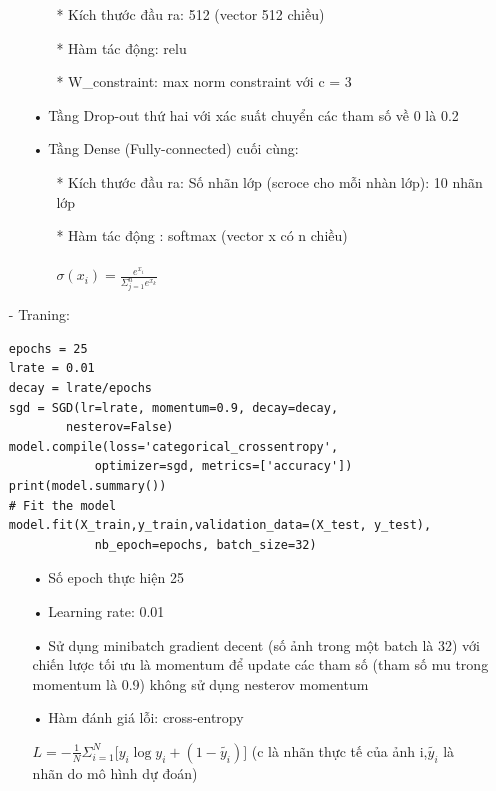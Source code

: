 \documentclass[a4paper,12pt]{report}
\begin{document}
\begin{itemize}
\begin{itemize}
\begin{itemize}
\item[*] Kích thước đầu ra: 512 (vector 512 chiều)
\item[*] Hàm tác động: relu
\item[*] W\_constraint:  max norm constraint với c = 3
\end{itemize}
\item[•] Tầng Drop-out thứ hai với xác suất chuyển các tham số về 0 là 0.2
\item[•] Tầng Dense (Fully-connected) cuối cùng:
\begin{itemize}
\item[*] Kích thước đầu ra: Số nhãn lớp (scroce cho mỗi nhàn lớp): 10 nhãn lớp
\item[*] Hàm tác động : softmax (vector x có n chiều) \\ \\ 
\hspace*{2cm} $\sigma(x_i) = \frac{e^{x_i}}{\Sigma_{j=1}^{n}e^{x_k}}$
\end{itemize}
\end{itemize}
\item[-] Traning:
\begin{lstlisting}
epochs = 25
lrate = 0.01
decay = lrate/epochs
sgd = SGD(lr=lrate, momentum=0.9, decay=decay, 
		nesterov=False)
model.compile(loss='categorical_crossentropy', 
			optimizer=sgd, metrics=['accuracy'])
print(model.summary())
# Fit the model
model.fit(X_train,y_train,validation_data=(X_test, y_test), 
			nb_epoch=epochs, batch_size=32)
\end{lstlisting}
\begin{itemize}
\item[•] Số epoch thực hiện 25
\item[•] Learning rate: 0.01
\item[•] Sử dụng minibatch gradient decent (số ảnh trong một batch là 32) với chiến lược tối ưu là momentum để update các tham số (tham số mu trong momentum là 0.9) không sử dụng nesterov momentum
\item[•] Hàm đánh giá lỗi: cross-entropy \\
\begin{center}
$L = -\frac{1}{N}\Sigma_{i=1}^{N}\big[y_i\log y_i + (1-\tilde{y_i})\big]$ (c là nhãn thực tế của ảnh i,$\tilde{y_i}$ là nhãn do mô hình dự đoán)
\end{center}
\end{itemize}
\end{itemize}
\end{document}
